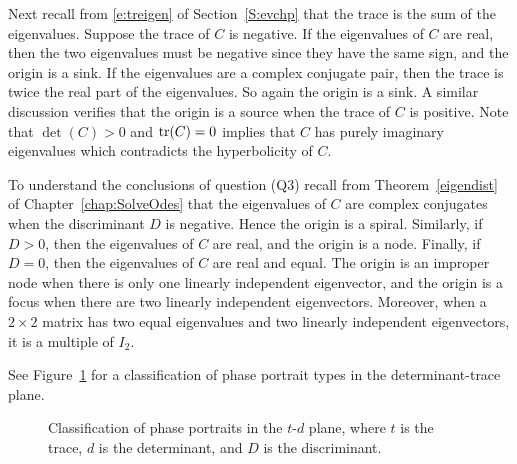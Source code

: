 \documentclass{ximera}
\begin{document}
Next recall from \eqref{e:treigen} of Section~\ref{S:evchp} that the trace is 
the sum of the 
eigenvalues. Suppose the trace of $C$ is negative.  If the eigenvalues
of $C$ are real, then the two eigenvalues must be negative since they
have the same sign, and the origin is a sink.  If the eigenvalues are
a complex conjugate pair, then the trace is twice the real part of the
eigenvalues.  So again the origin is a sink.  A similar discussion
verifies that the origin is a source when the trace of $C$ is positive.
Note that $\det(C)>0$ and ${\rm tr}(C)= 0$ implies that $C$ has purely
imaginary eigenvalues which contradicts the hyperbolicity of $C$.

To understand the conclusions of question (Q3) recall from
Theorem~\ref{eigendist} of Chapter~\ref{chap:SolveOdes} that the 
eigenvalues of $C$ are complex
conjugates when the discriminant $D$ is negative. Hence the origin is
a spiral.  Similarly, if $D>0$, then the eigenvalues of $C$ are real,
and the origin is a node.  Finally, if $D=0$, then the eigenvalues of
$C$ are real and equal.  The origin is an improper node when there is
only one linearly independent eigenvector, and the origin is a focus
when there are two linearly independent eigenvectors.  Moreover, when
a $2\times 2$ matrix has two equal eigenvalues and two linearly
independent eigenvectors, it is a multiple of $I_2$.

See Figure~\ref{F:td} for a classification of phase portrait types
in the determinant-trace plane.

\begin{figure}[htb]
           \centerline{%
           }
           \caption{Classification of phase portraits in the
		$t$-$d$ plane, where $t$ is the trace, $d$ is the
	determinant, and $D$ is the discriminant.}
           \label{F:td}
\end{figure}

\EXER

\TEXER
\end{document}
